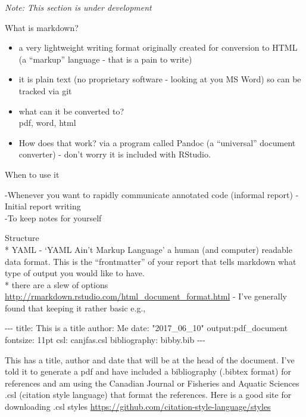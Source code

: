 \documentclass[
]{article}
\newenvironment{Shaded}{\begin{snugshade}}{\end{snugshade}}
\newcommand{\NormalTok}[1]{#1}
\newcommand{\SpecialCharTok}[1]{\textcolor[rgb]{0.00,0.00,0.00}{#1}}
\newcommand{\StringTok}[1]{\textcolor[rgb]{0.31,0.60,0.02}{#1}}
\begin{document}
\emph{Note: This section is under development}

What is markdown?

\begin{itemize}
\item
  a very lightweight writing format originally created for conversion to
  HTML (a ``markup'' language - that is a pain to write)
\item
  it is plain text (no proprietary software - looking at you MS Word) so
  can be tracked via git\\
\item
  what can it be converted to?\\
  pdf, word, html
\item
  How does that work? via a program called Pandoc (a ``universal''
  document converter) - don't worry it is included with RStudio.
\end{itemize}

When to use it

-Whenever you want to rapidly communicate annotated code (informal
report) -Initial report writing\\
-To keep notes for yourself

Structure\\
* YAML - `YAML Ain't Markup Language' a human (and computer) readable
data format. This is the ``frontmatter'' of your report that tells
markdown what type of output you would like to have.\\
* there are a slew of options
\url{http://rmarkdown.rstudio.com/html_document_format.html} - I've
generally found that keeping it rather basic e.g.,

\begin{Shaded}
\begin{Highlighting}[]
\SpecialCharTok{{-}{-}{-}}
\NormalTok{title}\SpecialCharTok{:} \StringTok{\textquotesingle{}This is a title\textquotesingle{}}
\NormalTok{author}\SpecialCharTok{:} \StringTok{\textquotesingle{}Me\textquotesingle{}}
\NormalTok{date}\SpecialCharTok{:} \StringTok{"2017\_06\_10"}
\NormalTok{output}\SpecialCharTok{:}\NormalTok{pdf\_document}
\NormalTok{fontsize}\SpecialCharTok{:}\NormalTok{ 11pt}
\NormalTok{csl}\SpecialCharTok{:}\NormalTok{ canjfas.csl}
\NormalTok{bibliography}\SpecialCharTok{:}\NormalTok{ bibby.bib}
\SpecialCharTok{{-}{-}{-}}
\end{Highlighting}
\end{Shaded}

This has a title, author and date that will be at the head of the
document. I've told it to generate a pdf and have included a
bibliography (.bibtex format) for references and am using the Canadian
Journal or Fisheries and Aquatic Sciences .csl (citation style language)
that format the references. Here is a good site for downloading .csl
styles \url{https://github.com/citation-style-language/styles}
\end{document}
